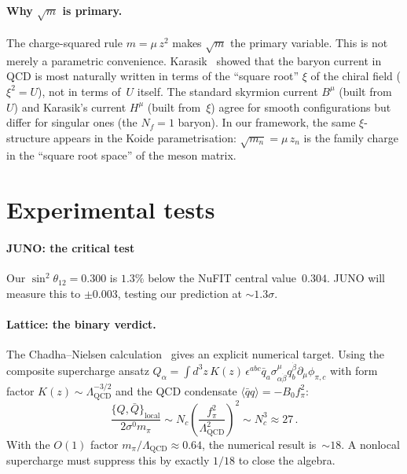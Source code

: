 \documentclass[aps,prd,twocolumn,showpacs,preprintnumbers,superscriptaddress]{revtex4-2}
\newcommand{\Lqcd}{\Lambda_{\mathrm{QCD}}}
\begin{document}
\paragraph{Why $\sqrt{m}$ is primary.}

The charge-squared rule $m = \mu\,z^2$ makes $\sqrt{m}$ the
primary variable.
This is not merely a parametric convenience.
Karasik~\cite{Karasik:2020} showed that the baryon current
in QCD is most naturally written in terms of the ``square root''
$\xi$ of the chiral field ($\xi^2 = U$), not in terms of~$U$
itself.
The standard skyrmion current $B^\mu$ (built from~$U$) and
Karasik's current $H^\mu$ (built from~$\xi$) agree for smooth
configurations but differ for singular ones (the $N_f = 1$
baryon).
In our framework, the same $\xi$-structure appears in the Koide
parametrisation: $\sqrt{m_n} = \mu\,z_n$ is the family charge
in the ``square root space'' of the meson matrix.

\section{Experimental tests}
\label{sec:tests}

\paragraph{JUNO: the critical test}

Our $\sin^2\theta_{12} = 0.300$ is $1.3\%$ below the NuFIT
central value~$0.304$.  JUNO will measure this to
$\pm 0.003$, testing our prediction at $\sim 1.3\sigma$.

\paragraph{Lattice: the binary verdict.}

The Chadha--Nielsen calculation~\cite{ChadhaNielsen:1977,v159}
gives an explicit numerical target.
Using the composite supercharge ansatz $Q_\alpha =
\int d^3z\,K(z)\,\epsilon^{abc}\bar q_a\sigma^\mu_{\alpha\dot\beta}
q_b^{\dot\beta}\partial_\mu\phi_{\pi,c}$ with form factor
$K(z) \sim \Lqcd^{-3/2}$ and the QCD condensate
$\langle\bar q q\rangle = -B_0 f_\pi^2$:
\begin{equation}
  \frac{\{Q,\bar Q\}_{\mathrm{local}}}{2\sigma^0 m_\pi}
  \sim N_c\left(\frac{f_\pi^2}{\Lqcd^2}\right)^2
  \sim N_c^3 \approx 27\,.
  \label{eq:CN_factor}
\end{equation}
With the $O(1)$ factor $m_\pi/\Lqcd \approx 0.64$, the
numerical result is~$\sim 18$.
A nonlocal supercharge must suppress this by exactly
$1/18$ to close the algebra.
\end{document}

